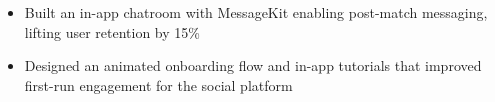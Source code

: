 \begin{itemize}
    \item Built an in-app chatroom with MessageKit enabling post-match messaging, lifting user retention by 15\%
    \item Designed an animated onboarding flow and in-app tutorials that improved first-run engagement for the social platform
\end{itemize}
